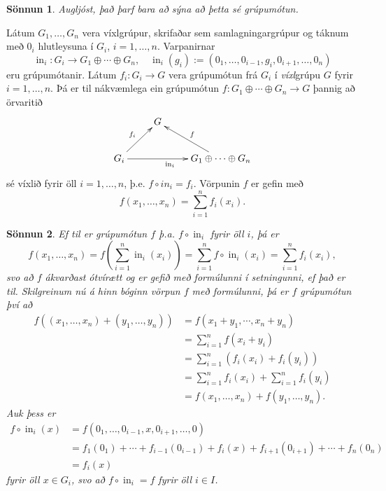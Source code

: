 \documentclass[a4paper,icelandic,11pt]{book}
\theoremstyle{plain}
\newtheorem*{sonnun}{Sönnun}
\DeclareMathOperator{\ivarp}{in} %
\begin{document}
\begin{sonnun}
  Augljóst, það þarf bara að sýna að þetta sé grúpumótun.
\end{sonnun}
\begin{setn}
  Látum $G_1,\dots, G_n$ vera víxlgrúpur, skrifaðar sem samlagningargrúpur
  og táknum með $0_i$ hlutleysuna í $G_i$, $i=1,\dots,n$. Varpanirnar
  \begin{equation*}
    \ivarp_i:G_i\to G_1\oplus\cdots\oplus G_n,
    \quad
    \ivarp_i(g_i) := \left( 0_1,\dots,0_{i-1},g_i,0_{i+1},\dots,0_n \right)
  \end{equation*}
  eru grúpumótanir.
  Látum
  $f_i : G_i \to G$ vera grúpumótun frá $G_i$ í \emph{víxl}grúpu $G$ fyrir
  $i=1,\dots,n$. 
  Þá er til nákvæmlega ein grúpumótun $f:G_1\oplus\cdots\oplus G_n \to
  G$ þannig að örvaritið 
  \begin{equation*}
  \xymatrix{
    & G & 
    \\
    G_i \ar[ur]^{f_i} \ar [rr]_{\ivarp_i} 
    &
    & {G_1\oplus\cdots\oplus G_n} \ar[ul]_{f}
  }
  \end{equation*}
  sé víxlið fyrir öll $i = 1,\dots, n$, þ.e.
  $f\circ in_i = f_i$. Vörpunin $f$ er gefin með
  \begin{equation*}
    f(x_1,\dots,x_n ) = \sum_{i=1}^{n}f_i(x_i).
  \end{equation*}
\end{setn}
\begin{sonnun}
  Ef til er grúpumótun $f$ þ.a. $f\circ \ivarp_i$ fyrir öll $i$, þá er
  \[
  f(x_1,\dots,x_n)
  = f\left( \sum_{i=1}^{n}\ivarp_i(x_i) \right)
  = \sum_{i=1}^{n}f\circ\ivarp_i(x_i)
  = \sum_{i=1}^{n}f_i(x_i),
  \]
  svo að $f$ ákvarðast ótvírætt og er gefið með formúlunni í setningunni, ef það
  er til. Skilgreinum nú á hinn bóginn vörpun $f$ með formúlunni, þá er
  $f$ grúpumótun því að
  \begin{align*}
    f( (x_1,\dots,x_n)+ (y_1,\dots,y_n) )
    &= f(x_1+y_1,\cdots,x_n+y_n)\\
    &= \sum_{i=1}^{n}f(x_i+y_i) \\
    &= \sum_{i=1}^{n}\left( f_i(x_i) + f_i(y_i) \right) \\
    &= \sum_{i=1}^{n}f_i(x_i) + \sum_{i=1}^{n}f_i(y_i) \\
    &= f(x_1,\dots,x_n) + f(y_1,\dots,y_n).
  \end{align*}
  Auk þess er
  \begin{align*}
    f\circ\ivarp_i(x)
    &= f(0_1,\dots,0_{i-1},x,0_{i+1},\dots,0) \\
    &= f_1(0_1) + \cdots + f_{i-1}(0_{i-1}) + f_i(x) + f_{i+1}(0_{i+1}) + \cdots
    + f_n(0_n) \\
    &= f_i(x)
  \end{align*}
  fyrir öll $x\in G_i$, svo að $f\circ \ivarp_i = f$ fyrir öll $i\in I$.
\end{sonnun}
\end{document}
